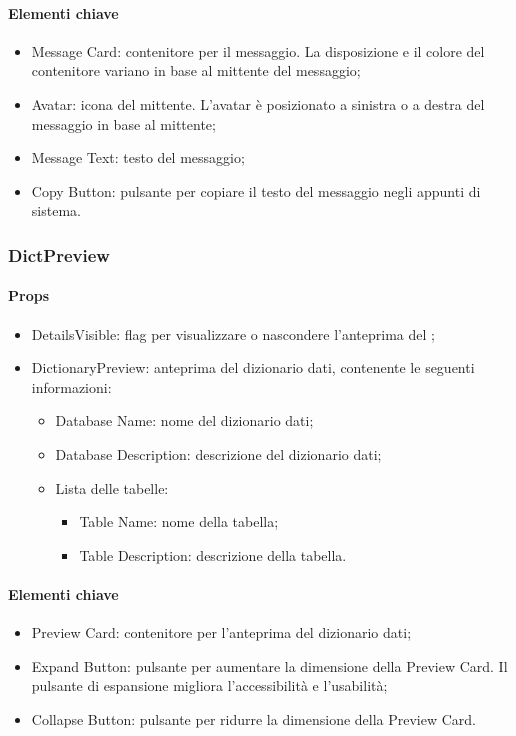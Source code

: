 \paragraph*{Elementi chiave}
\begin{itemize}
  \item Message Card: contenitore per il messaggio. La disposizione e il colore del contenitore variano in base al mittente del messaggio;
  \item Avatar: icona del mittente. L'avatar è posizionato a sinistra o a destra del messaggio in base al mittente;
  \item Message Text: testo del messaggio;
  \item Copy Button: pulsante per copiare il testo del messaggio negli appunti di sistema.
\end{itemize}

\subsubsection{DictPreview}

\paragraph*{Props}
\begin{itemize}
  \item DetailsVisible: flag per visualizzare o nascondere l'anteprima del ;
  \item DictionaryPreview: anteprima del dizionario dati, contenente le seguenti informazioni:
  \begin{itemize}
    \item Database Name: nome del dizionario dati;
    \item Database Description: descrizione del dizionario dati;
    \item Lista delle tabelle: 
    \begin{itemize}
      \item Table Name: nome della tabella;
      \item Table Description: descrizione della tabella.
    \end{itemize}
  \end{itemize}
\end{itemize}

\paragraph*{Elementi chiave}
\begin{itemize}
  \item Preview Card: contenitore per l'anteprima del dizionario dati;
  \item Expand Button: pulsante per aumentare la dimensione della Preview Card. Il pulsante di espansione migliora l'accessibilità e l'usabilità;
  \item Collapse Button: pulsante per ridurre la dimensione della Preview Card.
\end{itemize}

